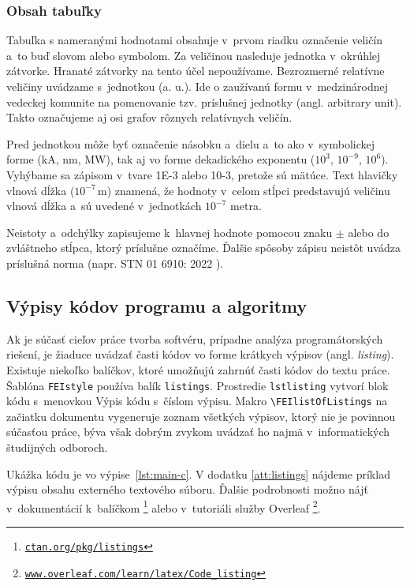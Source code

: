 \subsubsection{Obsah tabuľky}
Tabuľka s nameranými hodnotami obsahuje v~prvom riadku označenie 
veličín a~to buď slovom alebo symbolom.
Za veličinou nasleduje jednotka v~okrúhlej zátvorke.
Hranaté zátvorky na tento účel nepoužívame.
Bezrozmerné relatívne veličiny uvádzame s~jednotkou (a. u.).
Ide o zaužívanú formu v~medzinárodnej vedeckej komunite na pomenovanie tzv. príslušnej jednotky (angl. \foreignlanguage{english}{arbitrary unit}).
Takto označujeme aj osi grafov rôznych relatívnych veličín.

Pred jednotkou môže byť označenie násobku
a~dielu a~to ako v~symbolickej forme (kA, nm, MW), 
tak aj vo forme dekadického exponentu ($10^3$, $10^{-9}$, $10^6$).
Vyhýbame sa zápisom v~tvare 1E-3 alebo 10-3,
pretože sú mätúce.
Text hlavičky vlnová dĺžka ($10^{-7}$\,m) znamená,
že hodnoty v~celom stĺpci predstavujú veličinu vlnová dĺžka
a~sú uvedené v~jednotkách $10^{-7}$ metra.

Neistoty a~odchýlky zapisujeme k~hlavnej hodnote pomocou
znaku $\pm$ alebo do zvláštneho stĺpca,
ktorý príslušne označíme.
Ďalšie spôsoby zápisu neistôt uvádza príslušná norma (napr. STN 01 6910: 2022 \cite{stn016910}).

\subsection{Výpisy kódov programu a algoritmy}
\label{sec:listings}
Ak je súčasť cieľov práce tvorba softvéru, prípadne analýza programátorských riešení,
je žiaduce uvádzať časti kódov vo forme krátkych výpisov (angl. \foreignlanguage{english}{\emph{listing}}).
Existuje niekoľko balíčkov, ktoré umožňujú zahrnúť časti kódov do textu práce.
Šablóna \verb|FEIstyle| používa balík \verb|listings|.
Prostredie \verb|lstlisting| vytvorí blok kódu s~menovkou Výpis kódu s~číslom výpisu.
Makro \verb|\FEIlistOfListings| na začiatku dokumentu vygeneruje zoznam všetkých výpisov,
ktorý nie je povinnou súčasťou práce,
býva však dobrým zvykom uvádzať ho najmä v~informatických študijných odboroch.

Ukážka kódu je vo výpise~\ref{lst:main-c}.
V dodatku \ref{att:listings} nájdeme príklad výpisu obsahu externého textového súboru. 
Ďalšie podrobnosti možno nájť v~dokumentácií k~balíčkom%
\footnote{\href{https://ctan.org/pkg/listings}{\texttt{ctan.org/pkg/listings}}}
alebo v~tutoriáli služby Overleaf%
\footnote{\texttt{\href{https://www.overleaf.com/learn/latex/Code_listing}{www.overleaf.com/learn/latex/Code\_listing}}}.

